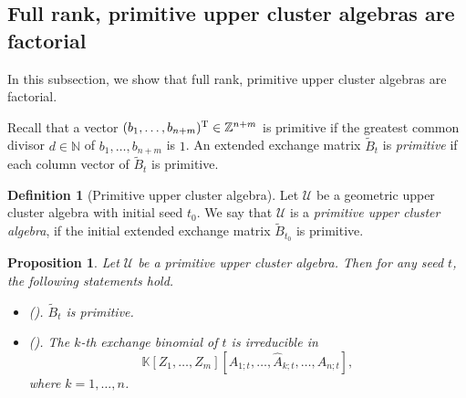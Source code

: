 \documentclass{amsart}
\newtheorem{proposition}[theorem]{Proposition}
\theoremstyle{definition}
\newtheorem{definition}[theorem]{Definition}
\theoremstyle{remark}
\numberwithin{equation}{section}
\begin{document}
\subsection{Full rank, primitive upper cluster algebras are factorial}\label{sec42}
In this subsection, we show that  full rank, primitive upper cluster algebras are factorial.

Recall that a vector $(b_1,\ldots,b_{n+m})^{\rm T}\in\mathbb Z^{n+m}$ is primitive if the greatest common divisor $d\in\mathbb N$ of $b_1,\ldots,b_{n+m}$ is $1$. An extended exchange matrix $\widetilde B_t$ is {\em primitive} if each column vector of  $\widetilde B_t$ is primitive.

\begin{definition}[Primitive upper cluster algebra] Let $\mathcal U$ be a geometric upper cluster algebra with initial seed $t_0$. We say that $\mathcal U$ is a {\em primitive upper cluster algebra}, if the initial extended exchange matrix $\widetilde B_{t_0}$ is primitive.
\end{definition}


\begin{proposition}\label{propriex}
Let $\mathcal U$ be a primitive upper cluster algebra. Then for any seed $t$, the following statements hold.
\begin{itemize}
\item[(i)]{\rm (}\cite[Lemma 4.3]{LP16}{\rm ).}  $\widetilde B_t$ is primitive.
\item[(ii)] {\rm (}\cite[Lemma 4.1]{LP16}{\rm ).} The $k$-th exchange binomial of $t$ is irreducible in $$\mathbb K[Z_1,\ldots,Z_m][A_{1;t},\ldots,\widehat A_{k;t},\ldots,A_{n;t}],$$ where $k=1,\ldots,n$.
\end{itemize}
\end{proposition}
\end{document}
